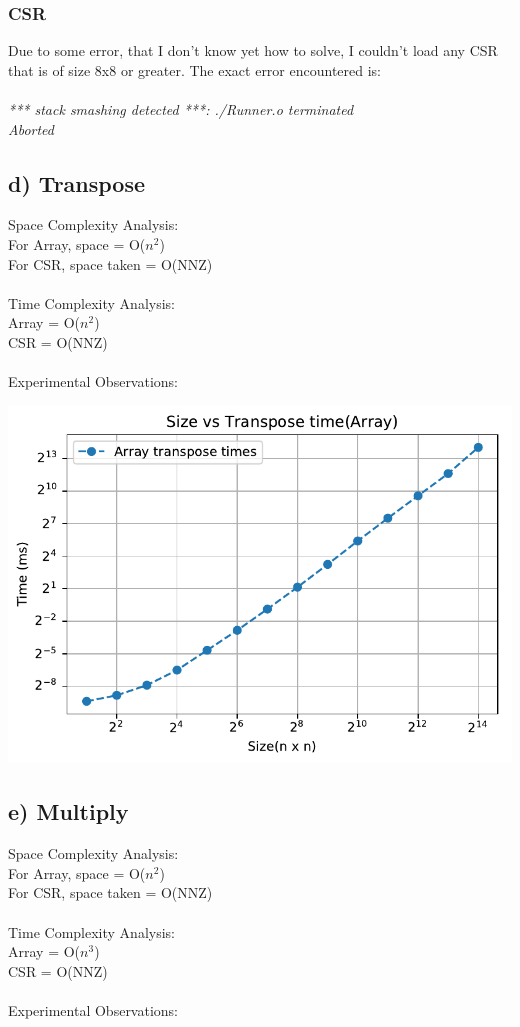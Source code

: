 \documentclass[12pt, a4paper]{report}
\begin{document}
\subsubsection*{CSR}
Due to some error, that I don't know yet how to solve, I couldn't load any CSR that is of size 8x8 or greater.
The exact error encountered is: \\~\\
\textit{*** stack smashing detected ***: ./Runner.o terminated \\
Aborted}


\subsection*{d) Transpose}
Space Complexity Analysis: \\
For Array, space = O($n^2$) \\
For CSR, space taken = O(NNZ) \\~\\
Time Complexity Analysis: \\
Array = O($n^2$) \\
CSR = O(NNZ) \\~\\
Experimental Observations: \\

\begin{center}
\includegraphics{transpose_arr.pdf}
\end{center}



\newpage

\subsection*{e) Multiply}
Space Complexity Analysis: \\
For Array, space = O($n^2$) \\
For CSR, space taken = O(NNZ) \\~\\
Time Complexity Analysis: \\
Array = O($n^3$) \\
CSR = O(NNZ) \\~\\
Experimental Observations: \\
\end{document}
